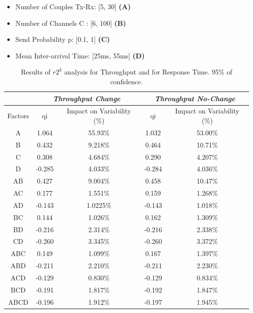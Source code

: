 \begin{itemize}
	\item Number of Couples Tx-Rx: [5, 30] \textbf{(A)}
	\item Number of Channels C : [6, 100] \textbf{(B)}
	\item Send Probability p: [0.1, 1] \textbf{(C)}
	\item Mean Inter-arrival Time: [25ms, 55ms] \textbf{(D)}    
\end{itemize}

\begin{table}[H]
	\centering
	\begin{tabular}{|c|c|c|c|c|}
		\hline
		\textbf{} & \multicolumn{2}{c|}{\textit{\textbf{Throughput Change}}} & \multicolumn{2}{c|}{\textit{\textbf{Throughput No-Change}}} \\ \hline
		Factors   & qi          & Impact on Variability (\%)          & qi            & Impact on Variability (\%)           \\ \hline
		A    & 1.064	& 55.93\% 	& 1.032 &	53.00\%  \\ \hline
		B    & 0.432 &	9.218\% &	0.464 &	10.71\%  \\ \hline
		C    & 0.308 & 4.684\% & 0.290 &	4.207\%  \\ \hline
		D    & -0.285 &	4.033\% & -0.284 &	4.036\%  \\ \hline
		AB   & 0.427 & 9.004\% & 0.458 &	10.47\%  \\ \hline
		AC   & 0.177 & 1.551\% & 0.159 &	1.268\%  \\ \hline
		AD   & -0.143 &	1.0225\% & -0.143 & 1.018\%  \\ \hline
		BC   & 0.144 & 1.026\% &	0.162 &	1.309\%  \\ \hline
		BD   & -0.216 &	2.314\% & -0.216 & 2.338\%  \\ \hline
		CD   & -0.260 & 3.345\% & -0.260 & 3.372\%  \\ \hline
		ABC  & 0.149 & 	1.099\% & 0.167 & 1.397\%  \\ \hline
		ABD  & -0.211 &	2.210\% & -0.211 & 2.230\%  \\ \hline
		ACD  & -0.129 &	0.830\% & -0.129 & 0.834\%  \\ \hline
		BCD  & -0.191 &	1.817\% & -0.192 & 1.847\%  \\ \hline
		ABCD & -0.196 &	1.912\% & -0.197 & 1.945\%  \\ \hline
	
	\end{tabular}
	\caption{Results of $r2^k$ analysis for Throughput and for Response Time. 95\% of confidence.}
	\label{tab: 2kr_results_explosion}
\end{table}

